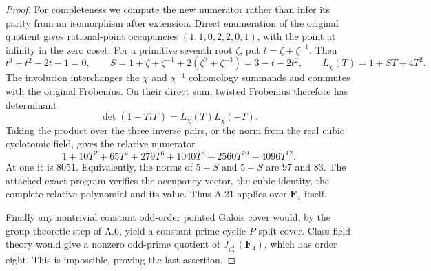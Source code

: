 \documentclass[11pt]{article}
\begin{document}
\begin{proof}
For completeness we compute the new numerator rather than infer its
parity from an isomorphism after extension.  Direct enumeration of the
original quotient gives rational-point occupancies
$(1,1,0,2,2,0,1)$, with the point at infinity in the zero coset.
For a primitive seventh root $\zeta$, put $t=\zeta+\zeta^{-1}$.
Then
\[
 t^3+t^2-2t-1=0,
 \qquad S=1+\zeta+\zeta^{-1}+2(\zeta^3+\zeta^{-3})
           =3-t-2t^2,
 \qquad L_{\chi}(T)=1+ST+4T^2.
\]
The involution interchanges the $\chi$ and $\chi^{-1}$ cohomology
summands and commutes with the original Frobenius.  On their direct
sum, twisted Frobenius therefore has determinant
\[
       \det(1-T\widetilde\iota F)
              =L_\chi(T)L_\chi(-T).
\]
Taking the product over the three inverse pairs, or the norm from the
real cubic cyclotomic field, gives the relative numerator
\[
 1+10T^2+65T^4+279T^6+1040T^8+2560T^{10}+4096T^{12}.
\]
At one it is $8051$.  Equivalently, the norms of $5+S$ and $5-S$ are
$97$ and $83$.  The attached exact program verifies the occupancy
vector, the cubic identity, the complete relative polynomial and its
value.  Thus A.21 applies over $\mathbf F_4$ itself.

Finally any nontrivial constant odd-order pointed Galois cover would,
by the group-theoretic step of A.6, yield a constant prime cyclic
$P$-split cover.  Class field theory would give a nonzero odd-prime
quotient of $J_{C_0^{\mathrm t}}(\mathbf F_4)$, which has order eight.
This is impossible, proving the last assertion.
\end{proof}
\end{document}
